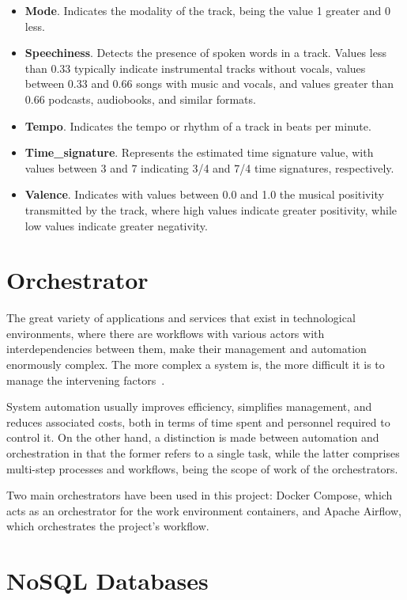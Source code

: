 \begin{itemize}
\begin{itemize}
		\item \textbf{Mode}. Indicates the modality of the track, being the value 1 greater and 0 less.
		\item \textbf{Speechiness}. Detects the presence of spoken words in a track. Values less than 0.33 typically indicate instrumental tracks without vocals, values between 0.33 and 0.66 songs with music and vocals, and values greater than 0.66 podcasts, audiobooks, and similar formats.
		\item \textbf{Tempo}. Indicates the tempo or rhythm of a track in beats per minute.
		\item \textbf{Time\_signature}. Represents the estimated time signature value, with values between 3 and 7 indicating 3/4 and 7/4 time signatures, respectively.
		\item \textbf{Valence}. Indicates with values between 0.0 and 1.0 the musical positivity transmitted by the track, where high values indicate greater positivity, while low values indicate greater negativity.
	\end{itemize}
\end{itemize}

\section{Orchestrator}

\nonzeroparskip The great variety of applications and services that exist in technological environments, where there are workflows with various actors with interdependencies between them, make their management and automation enormously complex. The more complex a system is, the more difficult it is to manage the intervening factors~\cite{redhat_orchestrator}.

\nonzeroparskip System automation usually improves efficiency, simplifies management, and reduces associated costs, both in terms of time spent and personnel required to control it. On the other hand, a distinction is made between automation and orchestration in that the former refers to a single task, while the latter comprises multi-step processes and workflows, being the scope of work of the orchestrators.

\nonzeroparskip Two main orchestrators have been used in this project: Docker Compose, which acts as an orchestrator for the work environment containers, and Apache Airflow, which orchestrates the project's workflow.

\section{NoSQL Databases}

